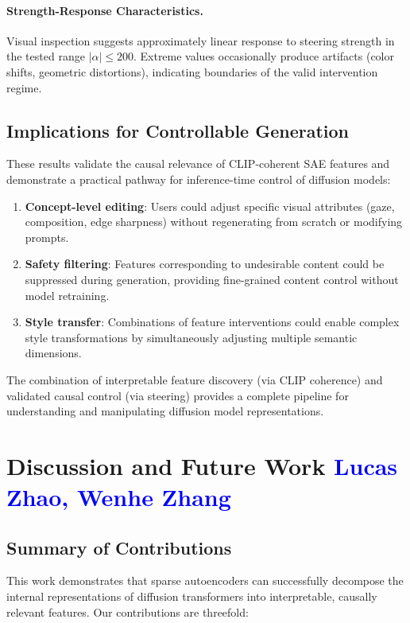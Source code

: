 \documentclass{article}
\begin{document}
\paragraph{Strength-Response Characteristics.}
Visual inspection suggests approximately linear response to steering strength in the tested range $|\alpha| \leq 200$. Extreme values occasionally produce artifacts (color shifts, geometric distortions), indicating boundaries of the valid intervention regime.

\subsection{Implications for Controllable Generation}

These results validate the causal relevance of CLIP-coherent SAE features and demonstrate a practical pathway for inference-time control of diffusion models:

\begin{enumerate}
    \item \textbf{Concept-level editing}: Users could adjust specific visual attributes (gaze, composition, edge sharpness) without regenerating from scratch or modifying prompts.
    
    \item \textbf{Safety filtering}: Features corresponding to undesirable content could be suppressed during generation, providing fine-grained content control without model retraining.
    
    \item \textbf{Style transfer}: Combinations of feature interventions could enable complex style transformations by simultaneously adjusting multiple semantic dimensions.
\end{enumerate}

The combination of interpretable feature discovery (via CLIP coherence) and validated causal control (via steering) provides a complete pipeline for understanding and manipulating diffusion model representations.


\section{Discussion and Future Work \textcolor{blue}{Lucas Zhao, Wenhe Zhang}}

\subsection{Summary of Contributions}
This work demonstrates that sparse autoencoders can successfully decompose the internal representations of diffusion transformers into interpretable, causally relevant features. Our contributions are threefold:
\end{document}
